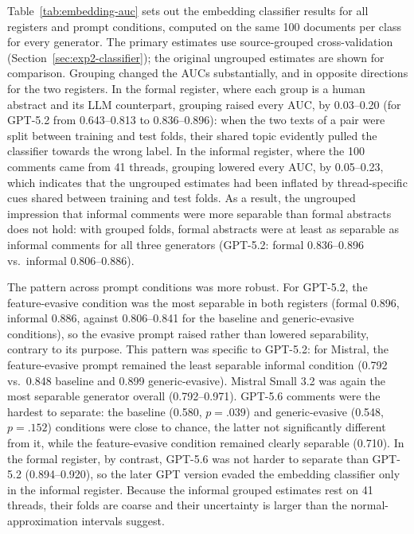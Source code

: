 \documentclass[thesis]{cluu}
\begin{document}
Table~\ref{tab:embedding-auc} sets out the embedding classifier results for all registers and prompt conditions, computed on the same 100 documents per class for every generator. The primary estimates use source-grouped cross-validation (Section~\ref{sec:exp2-classifier}); the original ungrouped estimates are shown for comparison. Grouping changed the AUCs substantially, and in opposite directions for the two registers. In the formal register, where each group is a human abstract and its LLM counterpart, grouping raised every AUC, by 0.03--0.20 (for GPT-5.2 from 0.643--0.813 to 0.836--0.896): when the two texts of a pair were split between training and test folds, their shared topic evidently pulled the classifier towards the wrong label. In the informal register, where the 100 comments came from 41 threads, grouping lowered every AUC, by 0.05--0.23, which indicates that the ungrouped estimates had been inflated by thread-specific cues shared between training and test folds. As a result, the ungrouped impression that informal comments were more separable than formal abstracts does not hold: with grouped folds, formal abstracts were at least as separable as informal comments for all three generators (GPT-5.2: formal 0.836--0.896 vs.\ informal 0.806--0.886).

The pattern across prompt conditions was more robust. For GPT-5.2, the feature-evasive condition was the most separable in both registers (formal 0.896, informal 0.886, against 0.806--0.841 for the baseline and generic-evasive conditions), so the evasive prompt raised rather than lowered separability, contrary to its purpose. This pattern was specific to GPT-5.2: for Mistral, the feature-evasive prompt remained the least separable informal condition (0.792 vs.\ 0.848 baseline and 0.899 generic-evasive). Mistral Small 3.2 was again the most separable generator overall (0.792--0.971). GPT-5.6 comments were the hardest to separate: the baseline (0.580, $p=.039$) and generic-evasive (0.548, $p=.152$) conditions were close to chance, the latter not significantly different from it, while the feature-evasive condition remained clearly separable (0.710). In the formal register, by contrast, GPT-5.6 was not harder to separate than GPT-5.2 (0.894--0.920), so the later GPT version evaded the embedding classifier only in the informal register. Because the informal grouped estimates rest on 41 threads, their folds are coarse and their uncertainty is larger than the normal-approximation intervals suggest.
\end{document}
